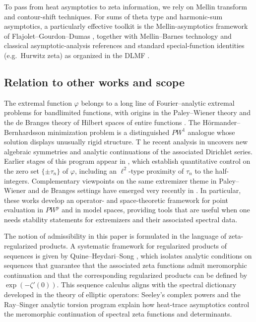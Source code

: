 \documentclass[11pt,letterpaper]{amsart}
\numberwithin{equation}{section}
\theoremstyle{definition}
\begin{document}
To pass from heat asymptotics to zeta information, we rely on Mellin transform and
contour-shift techniques. For sums of theta type and harmonic-sum asymptotics, a
particularly effective toolkit is the Mellin-asymptotics framework of
Flajolet--Gourdon--Dumas \cite{FlajoletGourdonDumas1995_MellinHarmonicSums}, together
with Mellin--Barnes technology and classical asymptotic-analysis references
\cite{ParisKaminski2001_MellinBarnes,Olver_AsymptoticsSpecialFunctions,Wong2001_AsymptoticIntegrals}
and standard special-function identities (e.g.\ Hurwitz zeta) as organized in the
DLMF \cite{NISTDLMF}.
\subsection{Relation to other works and scope}

The extremal function $\varphi$ belongs to a long line of Fourier--analytic extremal problems for bandlimited functions, with origins in the Paley--Wiener theory \cite{PaleyWiener34} and the de Branges theory of Hilbert spaces of entire functions \cite{deBranges68}.
The H\"ormander--Bernhardsson minimization problem \cite{HB93} is a distinguished $PW^1$ analogue whose solution displays unusually rigid structure. T he recent analysis in \cite{BOCRS} uncovers
new algebraic symmetries and analytic continuations of the associated Dirichlet series. Earlier stages of this program appear in \cite{BOCRS2024_HBI}, which establish
quantitative control on the zero set $\{\pm\tau_n\}$ of $\varphi$, including an $\ell^{2}$-type proximity of $\tau_n$ to the half-integers.
Complementary viewpoints on the same extremizer theme in Paley--Wiener
and de Branges settings have emerged very recently in \cite{BrevigChirreOrtegaCerdaSeip2024_PointEvalPW,Instanes2024_PWPointEval,Bergman2024_deBrangesPointEval}.
In particular, these works develop an operator- and space-theoretic framework for
point evaluation in $PW^{p}$ and in model spaces, providing tools that are
useful when one needs stability statements for extremizers and their associated
spectral data.

The notion of admissibility in this paper is formulated in the language of zeta-regularized products. A systematic framework for regularized products of sequences is given by Quine--Heydari--Song \cite{QHS},
which isolates analytic conditions on sequences that guarantee that the associated zeta functions admit meromorphic continuation and that the corresponding
regularized products can be defined by $\exp(-\zeta'(0))$.
This sequence calculus aligns with the spectral dictionary developed in the theory
of elliptic operators: Seeley's complex powers \cite{Seeley67} and the Ray--Singer
analytic torsion program \cite{RaySinger71} explain how heat-trace asymptotics control
the meromorphic continuation of spectral zeta functions and determinants.
\end{document}
